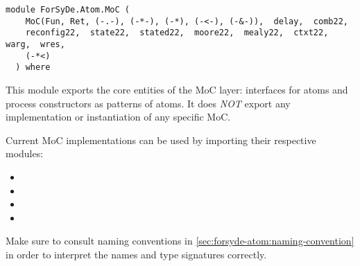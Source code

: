 \label{module:ForSyDe.Atom.MoC}
\haddockbeginheader
{\haddockverb\begin{verbatim}
module ForSyDe.Atom.MoC (
    MoC(Fun, Ret, (-.-), (-*-), (-*), (-<-), (-&-)),  delay,  comb22, 
    reconfig22,  state22,  stated22,  moore22,  mealy22,  ctxt22,  warg,  wres, 
    (-*<)
  ) where\end{verbatim}}
\haddockendheader

This module exports the core entities of the MoC layer: interfaces
 for atoms and process constructors as patterns of atoms. It does
 \emph{NOT} export any implementation or instantiation of any specific
 MoC.\par
Current MoC implementations can be used by importing their
 respective modules:\par
\begin{itemize}
\item
{}\par

\item
{}\par

\item
{}\par

\item
{}\par

\end{itemize}
\begin{mdframed}[style=reminder,frametitle=Reminder]Make sure to consult naming conventions in  \cref{sec:forsyde-atom:naming-convention} in order to interpret the names and type signatures correctly.\end{mdframed}\par

